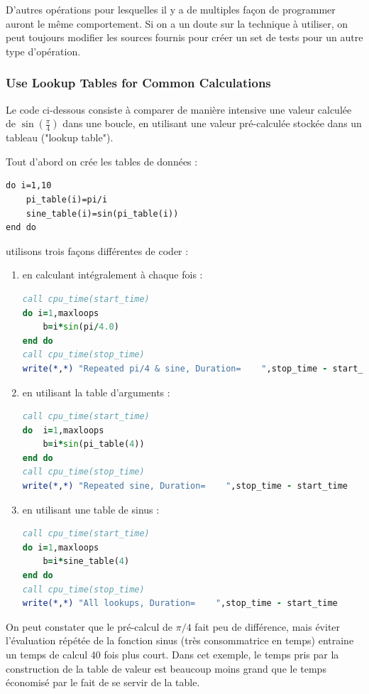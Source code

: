 \documentclass[a4paper,twoside]{article}
\begin{document}
\begin{remarque}
D'autres opérations pour lesquelles il y a de multiples façon de programmer auront le même comportement. Si on a un doute sur la technique à utiliser, on peut toujours modifier les sources fournis pour créer un set de tests pour un autre type d'opération.
\end{remarque}


\subsubsection{Use Lookup Tables for Common Calculations}
Le code ci-dessous consiste à comparer de manière intensive une valeur calculée de $\sin\left(\frac{\pi}{4}\right)$ dans une boucle, en utilisant une valeur pré-calculée stockée dans un tableau ("lookup table").

Tout d'abord on crée les tables de données : 
\begin{verbatim}
do i=1,10
    pi_table(i)=pi/i
    sine_table(i)=sin(pi_table(i))
end do
\end{verbatim}

utilisons trois façons différentes de coder :
\begin{enumerate}
\item en calculant intégralement à chaque fois :
\begin{lstlisting}[language=Fortran]
call cpu_time(start_time)
do i=1,maxloops
    b=i*sin(pi/4.0)
end do
call cpu_time(stop_time)
write(*,*) "Repeated pi/4 & sine, Duration=    ",stop_time - start_time
\end{lstlisting}

\item en utilisant la table d'arguments :
\begin{lstlisting}[language=Fortran]
call cpu_time(start_time)
do  i=1,maxloops
    b=i*sin(pi_table(4))
end do
call cpu_time(stop_time)
write(*,*) "Repeated sine, Duration=    ",stop_time - start_time
\end{lstlisting}

\item en utilisant une table de sinus :
\begin{lstlisting}[language=Fortran]
call cpu_time(start_time)
do i=1,maxloops
    b=i*sine_table(4)
end do
call cpu_time(stop_time)
write(*,*) "All lookups, Duration=    ",stop_time - start_time
\end{lstlisting}
\end{enumerate}

On peut constater que le pré-calcul de $\pi/4$ fait peu de différence, mais éviter l'évaluation répétée de la fonction sinus (très consommatrice en temps) entraine un temps de calcul 40 fois plus court. Dans cet exemple, le temps pris par la construction de la table de valeur est beaucoup moins grand que le temps économisé par le fait de se servir de la table.
\end{document}
